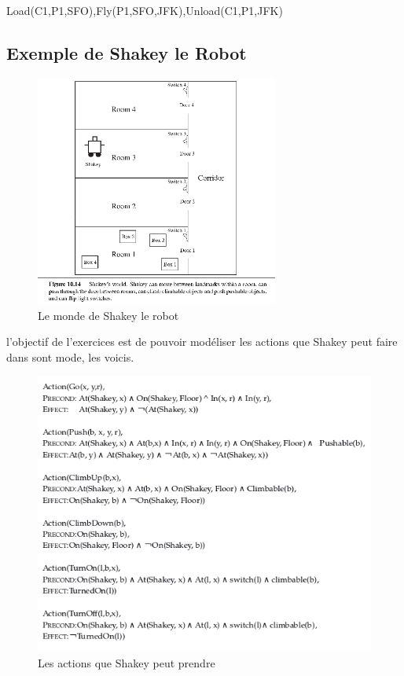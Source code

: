 \documentclass[oneside]{book}
\begin{document}
Load(C1,P1,SFO),Fly(P1,SFO,JFK),Unload(C1,P1,JFK)\\
\subsection{Exemple de Shakey le Robot}
\begin{figure}[!ht]
\centering
\includegraphics[width = 8cm]{Shakey.png}
\caption{Le monde de Shakey le robot}
\label{fig:shakey}
\end{figure}

l'objectif de l'exercices est de pouvoir modéliser les actions que Shakey peut faire dans sont mode, les voicis.\\

\begin{figure}[!ht]
\centering
\includegraphics[width = \linewidth]{Reponse_Shakey.png}
\caption{Les actions que Shakey peut prendre}
\label{fig:Reponse_Shakey}
\end{figure}
\end{document}
